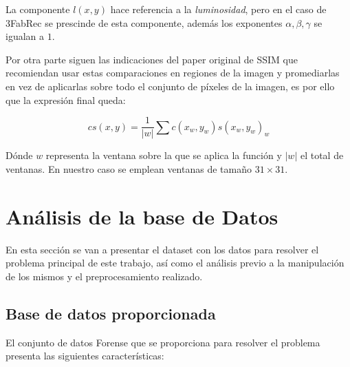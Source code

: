             \medskip

            \noindent La componente $l(x,y)$ hace referencia a la \textit{luminosidad}, pero en el caso de 3FabRec se prescinde de esta componente, además los exponentes $\alpha, \beta , \gamma$ se igualan a $1$.

            \medskip

            \noindent Por otra parte siguen las indicaciones del paper original de SSIM que recomiendan usar estas comparaciones en regiones de la imagen y promediarlas en vez de aplicarlas sobre todo el conjunto de píxeles de la imagen, es por ello que la expresión final queda:

            \begin{equation}
                cs(x,y)=\frac{1}{|w|} \sum{c(x_w,y_w)s(x_w,y_w)}_w
            \end{equation}

            \noindent Dónde $w$ representa la ventana sobre la que se aplica la función y $|w|$ el total de ventanas. En nuestro caso se emplean ventanas de tamaño $31\times 31$.

\section{Análisis de la base de Datos}
    \noindent En esta sección se van a presentar el dataset con los datos para resolver el problema principal de este trabajo, así como el análisis previo a la manipulación de los mismos y el preprocesamiento realizado.

    \subsection{Base de datos proporcionada}
        \noindent El conjunto de datos Forense que se proporciona para resolver el problema presenta las siguientes características: 

